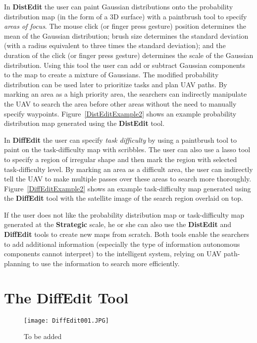 In \textbf{DistEdit} the user can paint Gaussian distributions onto the probability distribution map (in the form of a 3D surface) with a paintbrush tool to specify \textit{areas of focus}. The mouse click (or finger press gesture) position determines the mean of the Gaussian distribution; brush size determines the standard deviation (with a radius equivalent to three times the standard deviation); and the duration of the click (or finger press gesture) determines the scale of the Gaussian distribution. Using this tool the user can add or subtract Gaussian components to the map to create a mixture of Gaussians. The modified probability distribution can be used later to prioritize tasks and plan UAV paths. By marking an area as a high priority area, the searchers can indirectly manipulate the UAV to search the area before other areas without the need to manually specify waypoints. Figure~\ref{DistEditExample2} shows an example probability distribution map generated using the \textbf{DistEdit} tool.

In \textbf{DiffEdit} the user can specify \textit{task difficulty} by using a paintbrush tool to paint on the task-difficulty map with scribbles. The user can also use a lasso tool to specify a region of irregular shape and then mark the region with selected task-difficulty level. By marking an area as a difficult area, the user can indirectly tell the UAV to make multiple passes over these areas to search more thoroughly. Figure~\ref{DiffEditExample2} shows an example task-difficulty map generated using the \textbf{DiffEdit} tool with the satellite image of the search region overlaid on top.

If the user does not like the probability distribution map or task-difficulty map generated at the \textbf{Strategic} scale, he or she can also use the \textbf{DistEdit} and \textbf{DiffEdit} tools to create new maps from scratch. Both tools enable the searchers to add additional information (especially the type of information autonomous components cannot interpret) to the intelligent system, relying on UAV path-planning to use the information to search more efficiently.



\section{The DiffEdit Tool}
\label{}

\begin{figure}
\centering
\texttt{[image: DiffEdit001.JPG]}
\caption{To be added}
\label{DiffEdit001}
\end{figure}

